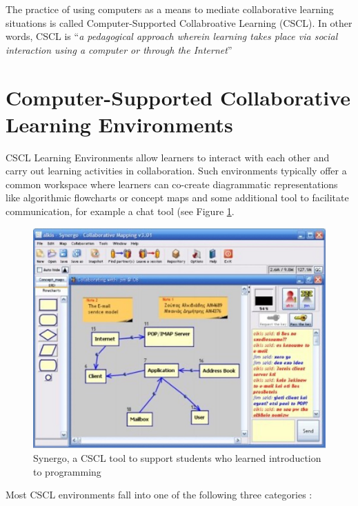 \documentclass[
]{book}
\begin{document}
The practice of using computers as a means to mediate collaborative learning situations is called Computer-Supported Collabroative Learning (CSCL). In other words, CSCL is ``\emph{a pedagogical approach wherein learning takes place via social interaction using a computer or through the Internet}''\citep{stahl2006cambridge}

\section{Computer-Supported Collaborative Learning Environments}\label{computer-supported-collaborative-learning-environments}

CSCL Learning Environments allow learners to interact with each other and carry out learning activities in collaboration. Such environments typically offer a common workspace where learners can co-create diagrammatic representations like algorithmic flowcharts or concept maps and some additional tool to facilitate communication, for example a chat tool (see Figure \ref{fig:synergo}.

\begin{figure}
\includegraphics[width=13cm]{./images/synergo} \caption{Synergo, a CSCL tool to support students who learned introduction to programming}\label{fig:synergo}
\end{figure}

Most CSCL environments fall into one of the following three categories \citep{soller2005mirroring}:
\end{document}
